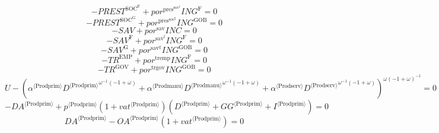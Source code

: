 \begin{equation}
-{P\!R\!E\!S\!T}^{\mathrm{SOC}^{\mathrm{F}}} + {{p\!o\!r}^{\mathrm{pres}^{\mathrm{soc}^{\mathrm{f}}}}} {{I\!N\!G}^{\mathrm{F}}} = 0
\end{equation}
\begin{equation}
-{P\!R\!E\!S\!T}^{\mathrm{SOC}^{\mathrm{G}}} + {{p\!o\!r}^{\mathrm{pres}^{\mathrm{soc}^{\mathrm{g}}}}} {{I\!N\!G}^{\mathrm{GOB}}} = 0
\end{equation}
\begin{equation}
-{S\!A\!V} + {{p\!o\!r}^{\mathrm{sav}}} {{I\!N\!C}} = 0
\end{equation}
\begin{equation}
-{S\!A\!V}^{\mathrm{F}} + {{p\!o\!r}^{\mathrm{sav}^{\mathrm{f}}}} {{I\!N\!G}^{\mathrm{F}}} = 0
\end{equation}
\begin{equation}
-{S\!A\!V}^{\mathrm{G}} + {{p\!o\!r}^{\mathrm{sav}^{\mathrm{g}}}} {{I\!N\!G}^{\mathrm{GOB}}} = 0
\end{equation}
\begin{equation}
-{T\!R}^{\mathrm{EMP}} + {{p\!o\!r}^{\mathrm{tremp}}} {{I\!N\!G}^{\mathrm{F}}} = 0
\end{equation}
\begin{equation}
-{T\!R}^{\mathrm{GOV}} + {{p\!o\!r}^{\mathrm{trgov}}} {{I\!N\!G}^{\mathrm{GOB}}} = 0
\end{equation}
\begin{equation}
U - \left({{\alpha}^{\langle \mathrm{\mathrm{Prodprim}}\rangle}} {{{D}^{\langle \mathrm{Prodprim}\rangle}}^{{\omega}^{-1} \left(-1 + \omega\right)}} + {{\alpha}^{\langle \mathrm{\mathrm{Prodmanu}}\rangle}} {{{D}^{\langle \mathrm{Prodmanu}\rangle}}^{{\omega}^{-1} \left(-1 + \omega\right)}} + {{\alpha}^{\langle \mathrm{\mathrm{Prodserv}}\rangle}} {{{D}^{\langle \mathrm{Prodserv}\rangle}}^{{\omega}^{-1} \left(-1 + \omega\right)}}\right)^{{\omega} \left(-1 + \omega\right)^{-1}} = 0
\end{equation}
\begin{equation}
-{{D\!A}}^{\langle \mathrm{Prodprim}\rangle} + {{p}^{\langle \mathrm{Prodprim}\rangle}} \left(1 + {{v\!a\!t}}^{\langle \mathrm{\mathrm{Prodprim}}\rangle}\right) \left({D}^{\langle \mathrm{Prodprim}\rangle} + {{G\!G}}^{\langle \mathrm{Prodprim}\rangle} + {I}^{\langle \mathrm{Prodprim}\rangle}\right) = 0
\end{equation}
\begin{equation}
{{D\!A}}^{\langle \mathrm{Prodprim}\rangle} - {{{O\!A}}^{\langle \mathrm{Prodprim}\rangle}} \left(1 + {{v\!a\!t}}^{\langle \mathrm{\mathrm{Prodprim}}\rangle}\right) = 0
\end{equation}
